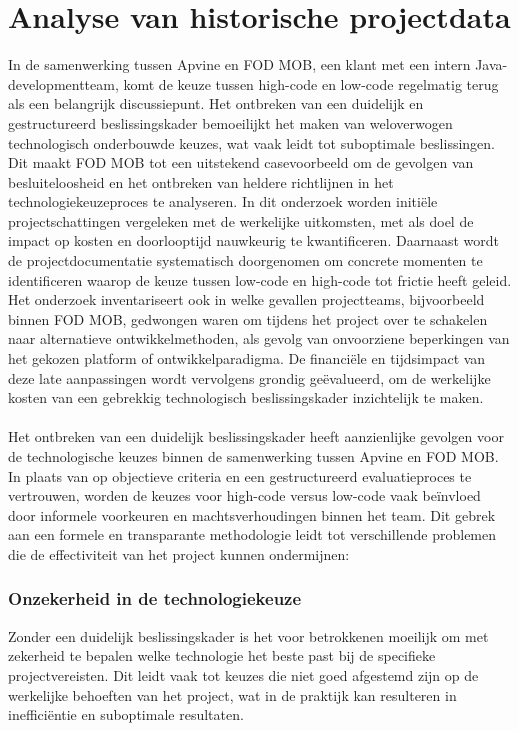 \section{Analyse van historische projectdata}
In de samenwerking tussen Apvine en \gls{FOD MOB}, een klant met een intern Java-developmentteam, komt de keuze tussen high-code en low-code regelmatig terug als een belangrijk discussiepunt. Het ontbreken van een duidelijk en gestructureerd beslissingskader bemoeilijkt het maken van weloverwogen technologisch onderbouwde keuzes, wat vaak leidt tot suboptimale beslissingen. Dit maakt \gls{FOD MOB} tot een uitstekend casevoorbeeld om de gevolgen van besluiteloosheid en het ontbreken van heldere richtlijnen in het technologiekeuzeproces te analyseren. In dit onderzoek worden initiële projectschattingen vergeleken met de werkelijke uitkomsten, met als doel de impact op kosten en doorlooptijd nauwkeurig te kwantificeren. Daarnaast wordt de projectdocumentatie systematisch doorgenomen om concrete momenten te identificeren waarop de keuze tussen low-code en high-code tot frictie heeft geleid. Het onderzoek inventariseert ook in welke gevallen projectteams, bijvoorbeeld binnen \gls{FOD MOB}, gedwongen waren om tijdens het project over te schakelen naar alternatieve ontwikkelmethoden, als gevolg van onvoorziene beperkingen van het gekozen platform of ontwikkelparadigma. De financiële en tijdsimpact van deze late aanpassingen wordt vervolgens grondig geëvalueerd, om de werkelijke kosten van een gebrekkig technologisch beslissingskader inzichtelijk te maken.
\\
\\
Het ontbreken van een duidelijk beslissingskader heeft aanzienlijke gevolgen voor de technologische keuzes binnen de samenwerking tussen Apvine en \gls{FOD MOB}. In plaats van op objectieve criteria en een gestructureerd evaluatieproces te vertrouwen, worden de keuzes voor high-code versus low-code vaak beïnvloed door informele voorkeuren en machtsverhoudingen binnen het team. Dit gebrek aan een formele en transparante methodologie leidt tot verschillende problemen die de effectiviteit van het project kunnen ondermijnen:
\subsubsection{Onzekerheid in de technologiekeuze}
Zonder een duidelijk beslissingskader is het voor betrokkenen moeilijk om met zekerheid te bepalen welke technologie het beste past bij de specifieke projectvereisten. Dit leidt vaak tot keuzes die niet goed afgestemd zijn op de werkelijke behoeften van het project, wat in de praktijk kan resulteren in inefficiëntie en suboptimale resultaten.
